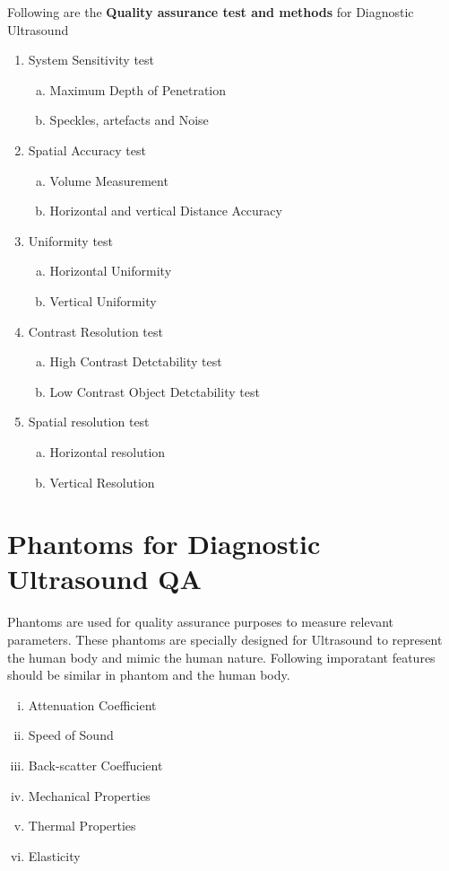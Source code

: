 \documentclass[12pt]{article}
\def \topic{Diagnostic Ultrasound}
\begin{document}
Following are the \textbf{Quality assurance test and methods} for \topic
\begin{enumerate}
    \item System Sensitivity test
    \begin{enumerate}[a.]
        \item Maximum Depth of Penetration
        \item Speckles, artefacts and Noise
    \end{enumerate}
    \item Spatial Accuracy test
    \begin{enumerate}[a.]
        \item Volume Measurement
        \item Horizontal and vertical Distance Accuracy
    \end{enumerate}
    \item Uniformity test
    \begin{enumerate}[a.]
        \item Horizontal Uniformity
        \item Vertical Uniformity
    \end{enumerate}
    \item Contrast Resolution test
    \begin{enumerate}[a.]
        \item High Contrast Detctability test
        \item Low Contrast Object Detctability test
    \end{enumerate}
    \item Spatial resolution test
    \begin{enumerate}[a.]
        \item Horizontal resolution
        \item Vertical Resolution
    \end{enumerate}
\end{enumerate}

\section{Phantoms for Diagnostic Ultrasound QA}
Phantoms are used for quality assurance purposes to measure relevant parameters. These phantoms are specially designed for Ultrasound to represent the human body and mimic the human nature. Following imporatant features should be similar in phantom and the human body. 
\begin{enumerate}[i.]
    \item Attenuation Coefficient 
    \item Speed of Sound
    \item Back-scatter Coeffucient
    \item Mechanical Properties
    \item Thermal Properties
    \item Elasticity
\end{enumerate}
\end{document}
